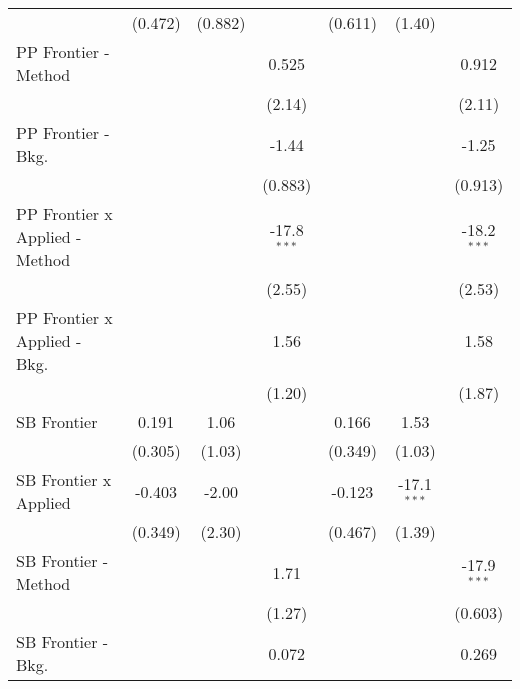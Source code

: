 \begin{tabular}{lcccccc}
                                  & (0.472)       & (0.882)       &               & (0.611)       & (1.40)        &   \\   
   PP Frontier - Method           &               &               & 0.525         &               &               & 0.912\\   
                                  &               &               & (2.14)        &               &               & (2.11)\\   
   PP Frontier - Bkg.             &               &               & -1.44         &               &               & -1.25\\   
                                  &               &               & (0.883)       &               &               & (0.913)\\   
   PP Frontier x Applied - Method &               &               & -17.8$^{***}$ &               &               & -18.2$^{***}$\\   
                                  &               &               & (2.55)        &               &               & (2.53)\\   
   PP Frontier x Applied - Bkg.   &               &               & 1.56          &               &               & 1.58\\   
                                  &               &               & (1.20)        &               &               & (1.87)\\   
   SB Frontier                    & 0.191         & 1.06          &               & 0.166         & 1.53          &   \\   
                                  & (0.305)       & (1.03)        &               & (0.349)       & (1.03)        &   \\   
   SB Frontier x Applied          & -0.403        & -2.00         &               & -0.123        & -17.1$^{***}$ &   \\   
                                  & (0.349)       & (2.30)        &               & (0.467)       & (1.39)        &   \\   
   SB Frontier - Method           &               &               & 1.71          &               &               & -17.9$^{***}$\\   
                                  &               &               & (1.27)        &               &               & (0.603)\\   
   SB Frontier - Bkg.             &               &               & 0.072         &               &               & 0.269\\   

\end{tabular}
